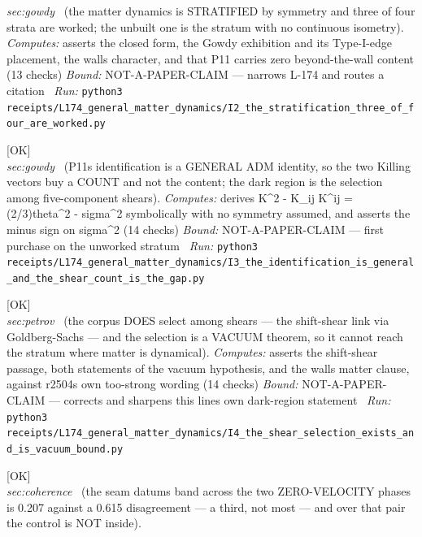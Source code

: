 \begin{description}
\textit{sec:gowdy} \ (the matter dynamics is STRATIFIED by symmetry and three of four strata are worked; the unbuilt one is the stratum with no continuous isometry). 
\emph{Computes:} asserts the closed form, the Gowdy exhibition and its Type-I-edge placement, the walls character, and that P11 carries zero beyond-the-wall content (13 checks)
 \emph{Bound:} NOT-A-PAPER-CLAIM --- narrows L-174 and routes a citation
\ \emph{Run:} \texttt{python3 receipts/L174\_general\_matter\_dynamics/I2\_the\_stratification\_three\_of\_four\_are\_worked.py}
\item[\label{rcpt:I3_the_identification_is_general_and_the_shear_count_is_the_gap}\texttt{I3\_the\_identification\_is\_general\_and\_the\_shear\_count\_is\_the\_gap}]\hfill\textsf{[OK]}\\
\textit{sec:gowdy} \ (P11s identification is a GENERAL ADM identity, so the two Killing vectors buy a COUNT and not the content; the dark region is the selection among five-component shears). 
\emph{Computes:} derives K\textasciicircum{}2 - K\_ij K\textasciicircum{}ij = (2/3)theta\textasciicircum{}2 - sigma\textasciicircum{}2 symbolically with no symmetry assumed, and asserts the minus sign on sigma\textasciicircum{}2 (14 checks)
 \emph{Bound:} NOT-A-PAPER-CLAIM --- first purchase on the unworked stratum
\ \emph{Run:} \texttt{python3 receipts/L174\_general\_matter\_dynamics/I3\_the\_identification\_is\_general\_and\_the\_shear\_count\_is\_the\_gap.py}
\item[\label{rcpt:I4_the_shear_selection_exists_and_is_vacuum_bound}\texttt{I4\_the\_shear\_selection\_exists\_and\_is\_vacuum\_bound}]\hfill\textsf{[OK]}\\
\textit{sec:petrov} \ (the corpus DOES select among shears --- the shift-shear link via Goldberg-Sachs --- and the selection is a VACUUM theorem, so it cannot reach the stratum where matter is dynamical). 
\emph{Computes:} asserts the shift-shear passage, both statements of the vacuum hypothesis, and the walls matter clause, against r2504s own too-strong wording (14 checks)
 \emph{Bound:} NOT-A-PAPER-CLAIM --- corrects and sharpens this lines own dark-region statement
\ \emph{Run:} \texttt{python3 receipts/L174\_general\_matter\_dynamics/I4\_the\_shear\_selection\_exists\_and\_is\_vacuum\_bound.py}
\item[\label{rcpt:B8_the_zero_velocity_band_is_a_third_of_the_gap}\texttt{B8\_the\_zero\_velocity\_band\_is\_a\_third\_of\_the\_gap}]\hfill\textsf{[OK]}\\
\textit{sec:coherence} \ (the seam datums band across the two ZERO-VELOCITY phases is 0.207 against a 0.615 disagreement --- a third, not most --- and over that pair the control is NOT inside). 

\end{description}
